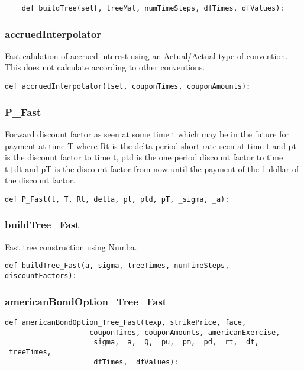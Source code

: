 \documentclass[twoside,11pt]{book}
\begin{document}
\begin{lstlisting}
    def buildTree(self, treeMat, numTimeSteps, dfTimes, dfValues):
\end{lstlisting}

\subsubsection*{{\bf accruedInterpolator}}
Fast calulation of accrued interest using an Actual/Actual type of convention. This does not calculate according to other conventions.  

\begin{lstlisting}
def accruedInterpolator(tset, couponTimes, couponAmounts):
\end{lstlisting}

\subsubsection*{{\bf P\_Fast}}
Forward discount factor as seen at some time t which may be in the future for payment at time T where Rt is the delta-period short rate seen at time t and pt is the discount factor to time t, ptd is the one period discount factor to time t+dt and pT is the discount factor from now until the payment of the 1 dollar of the discount factor.  

\begin{lstlisting}
def P_Fast(t, T, Rt, delta, pt, ptd, pT, _sigma, _a):
\end{lstlisting}

\subsubsection*{{\bf buildTree\_Fast}}
Fast tree construction using Numba.  

\begin{lstlisting}
def buildTree_Fast(a, sigma, treeTimes, numTimeSteps, discountFactors):
\end{lstlisting}

\subsubsection*{{\bf americanBondOption\_Tree\_Fast}}


\begin{lstlisting}
def americanBondOption_Tree_Fast(texp, strikePrice, face,
                    couponTimes, couponAmounts, americanExercise,
                    _sigma, _a, _Q, _pu, _pm, _pd, _rt, _dt, _treeTimes,
                    _dfTimes, _dfValues):
\end{lstlisting}
\end{document}
